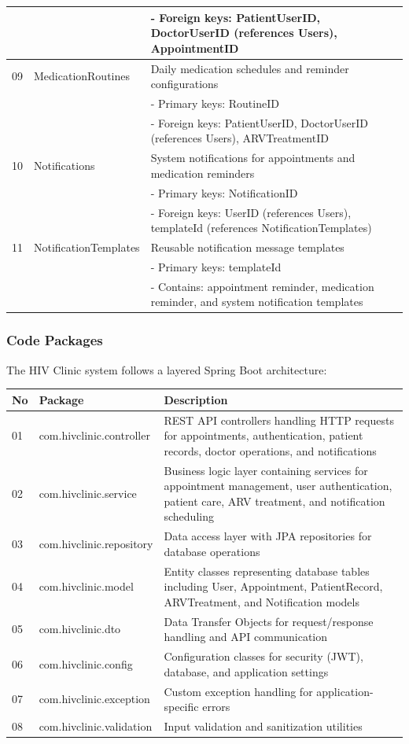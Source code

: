 \documentclass[12pt,a4paper]{article}
\begin{document}
\begin{longtable}{|p{1cm}|p{3cm}|p{10cm}|}
& & - Foreign keys: PatientUserID, DoctorUserID (references Users), AppointmentID \\
\hline
09 & MedicationRoutines & Daily medication schedules and reminder configurations \\
& & - Primary keys: RoutineID \\
& & - Foreign keys: PatientUserID, DoctorUserID (references Users), ARVTreatmentID \\
\hline
10 & Notifications & System notifications for appointments and medication reminders \\
& & - Primary keys: NotificationID \\
& & - Foreign keys: UserID (references Users), templateId (references NotificationTemplates) \\
\hline
11 & NotificationTemplates & Reusable notification message templates \\
& & - Primary keys: templateId \\
& & - Contains: appointment reminder, medication reminder, and system notification templates \\
\hline
\end{longtable}

\subsubsection{Code Packages}

The HIV Clinic system follows a layered Spring Boot architecture:

\begin{longtable}{|p{1cm}|p{4cm}|p{9cm}|}
\hline
\textbf{No} & \textbf{Package} & \textbf{Description} \\
\hline
01 & com.hivclinic.controller & REST API controllers handling HTTP requests for appointments, authentication, patient records, doctor operations, and notifications \\
\hline
02 & com.hivclinic.service & Business logic layer containing services for appointment management, user authentication, patient care, ARV treatment, and notification scheduling \\
\hline
03 & com.hivclinic.repository & Data access layer with JPA repositories for database operations \\
\hline
04 & com.hivclinic.model & Entity classes representing database tables including User, Appointment, PatientRecord, ARVTreatment, and Notification models \\
\hline
05 & com.hivclinic.dto & Data Transfer Objects for request/response handling and API communication \\
\hline
06 & com.hivclinic.config & Configuration classes for security (JWT), database, and application settings \\
\hline
07 & com.hivclinic.exception & Custom exception handling for application-specific errors \\
\hline
08 & com.hivclinic.validation & Input validation and sanitization utilities \\
\hline
\end{longtable}
\end{document}
